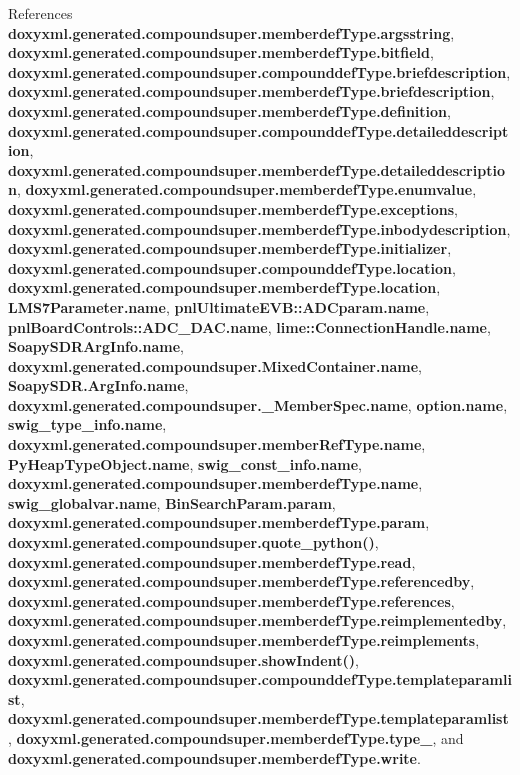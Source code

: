 References {\bf doxyxml.\+generated.\+compoundsuper.\+memberdef\+Type.\+argsstring}, {\bf doxyxml.\+generated.\+compoundsuper.\+memberdef\+Type.\+bitfield}, {\bf doxyxml.\+generated.\+compoundsuper.\+compounddef\+Type.\+briefdescription}, {\bf doxyxml.\+generated.\+compoundsuper.\+memberdef\+Type.\+briefdescription}, {\bf doxyxml.\+generated.\+compoundsuper.\+memberdef\+Type.\+definition}, {\bf doxyxml.\+generated.\+compoundsuper.\+compounddef\+Type.\+detaileddescription}, {\bf doxyxml.\+generated.\+compoundsuper.\+memberdef\+Type.\+detaileddescription}, {\bf doxyxml.\+generated.\+compoundsuper.\+memberdef\+Type.\+enumvalue}, {\bf doxyxml.\+generated.\+compoundsuper.\+memberdef\+Type.\+exceptions}, {\bf doxyxml.\+generated.\+compoundsuper.\+memberdef\+Type.\+inbodydescription}, {\bf doxyxml.\+generated.\+compoundsuper.\+memberdef\+Type.\+initializer}, {\bf doxyxml.\+generated.\+compoundsuper.\+compounddef\+Type.\+location}, {\bf doxyxml.\+generated.\+compoundsuper.\+memberdef\+Type.\+location}, {\bf L\+M\+S7\+Parameter.\+name}, {\bf pnl\+Ultimate\+E\+V\+B\+::\+A\+D\+Cparam.\+name}, {\bf pnl\+Board\+Controls\+::\+A\+D\+C\+\_\+\+D\+A\+C.\+name}, {\bf lime\+::\+Connection\+Handle.\+name}, {\bf Soapy\+S\+D\+R\+Arg\+Info.\+name}, {\bf doxyxml.\+generated.\+compoundsuper.\+Mixed\+Container.\+name}, {\bf Soapy\+S\+D\+R.\+Arg\+Info.\+name}, {\bf doxyxml.\+generated.\+compoundsuper.\+\_\+\+Member\+Spec.\+name}, {\bf option.\+name}, {\bf swig\+\_\+type\+\_\+info.\+name}, {\bf doxyxml.\+generated.\+compoundsuper.\+member\+Ref\+Type.\+name}, {\bf Py\+Heap\+Type\+Object.\+name}, {\bf swig\+\_\+const\+\_\+info.\+name}, {\bf doxyxml.\+generated.\+compoundsuper.\+memberdef\+Type.\+name}, {\bf swig\+\_\+globalvar.\+name}, {\bf Bin\+Search\+Param.\+param}, {\bf doxyxml.\+generated.\+compoundsuper.\+memberdef\+Type.\+param}, {\bf doxyxml.\+generated.\+compoundsuper.\+quote\+\_\+python()}, {\bf doxyxml.\+generated.\+compoundsuper.\+memberdef\+Type.\+read}, {\bf doxyxml.\+generated.\+compoundsuper.\+memberdef\+Type.\+referencedby}, {\bf doxyxml.\+generated.\+compoundsuper.\+memberdef\+Type.\+references}, {\bf doxyxml.\+generated.\+compoundsuper.\+memberdef\+Type.\+reimplementedby}, {\bf doxyxml.\+generated.\+compoundsuper.\+memberdef\+Type.\+reimplements}, {\bf doxyxml.\+generated.\+compoundsuper.\+show\+Indent()}, {\bf doxyxml.\+generated.\+compoundsuper.\+compounddef\+Type.\+templateparamlist}, {\bf doxyxml.\+generated.\+compoundsuper.\+memberdef\+Type.\+templateparamlist}, {\bf doxyxml.\+generated.\+compoundsuper.\+memberdef\+Type.\+type\+\_\+}, and {\bf doxyxml.\+generated.\+compoundsuper.\+memberdef\+Type.\+write}.




